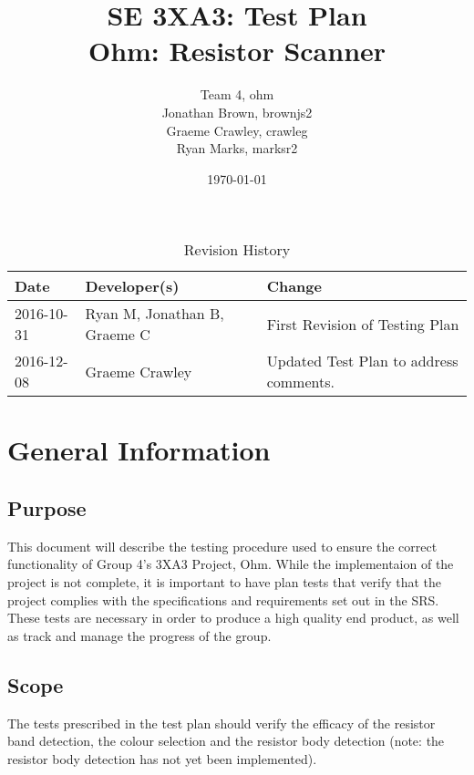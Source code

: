 \documentclass[12pt, titlepage]{article}
\title{SE 3XA3: Test Plan\\ Ohm: Resistor Scanner}
\author{Team 4, ohm
		\\ Jonathan Brown, brownjs2
		\\ Graeme Crawley, crawleg
		\\ Ryan Marks, marksr2
}
\date{\today}
\begin{document}
\begin{table}[hp]
\caption{Revision History} \label{TblRevisionHistory}
\begin{tabularx}{\textwidth}{llX}
\toprule
\textbf{Date} & \textbf{Developer(s)} & \textbf{Change}\\
\midrule
2016-10-31 & Ryan M, Jonathan B, Graeme C & First Revision of Testing Plan\\
2016-12-08 & Graeme Crawley & Updated Test Plan to address comments.\\
\bottomrule
\end{tabularx}
\end{table}


\maketitle
{}
\tableofcontents
\newpage
{}
\section{General Information}
\subsection{Purpose}
\par This document will describe the testing procedure used to ensure the correct functionality of Group 4's 3XA3 Project, Ohm. While the implementaion of the project is not complete, it is important to have plan tests that verify that the project complies with the specifications and requirements set out in the SRS. These tests are necessary in order to produce a high quality end product, as well as track and manage the progress of the group.
\subsection{Scope}
\par The tests prescribed in the test plan should verify the efficacy of the resistor band detection, the colour selection and the resistor body detection (note: the resistor body detection has not yet been implemented).
\end{document}
